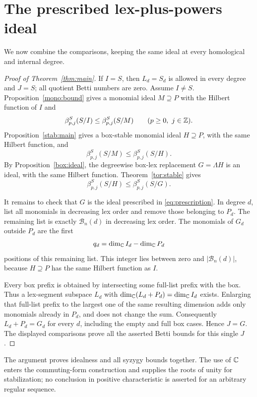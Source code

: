 \section{The prescribed lex-plus-powers ideal}\label{sec:assembly}

We now combine the comparisons, keeping the same ideal at every
homological and internal degree.

\begin{proof}[Proof of Theorem~\ref{thm:main}]
If \(I=S\), then \(L_d=S_d\) is allowed in every degree and \(J=S\);
all quotient Betti numbers are zero. Assume \(I\ne S\).
Proposition~\ref{mono:bound} gives a monomial ideal \(M\supseteq P\)
with the Hilbert function of \(I\) and
\[
 \beta^S_{p,j}(S/I)\le\beta^S_{p,j}(S/M)
 \qquad(p\ge0,\ j\in\mathbb Z).
\]
Proposition~\ref{stab:main} gives a box-stable monomial ideal
\(H\supseteq P\), with the same Hilbert function, and
\[
 \beta^S_{p,j}(S/M)\le\beta^S_{p,j}(S/H).
\]
By Proposition~\ref{box:ideal}, the degreewise box-lex replacement
\(G=\Lambda H\) is an ideal, with the same Hilbert function.
Theorem~\ref{tor:stable} gives
\[
 \beta^S_{p,j}(S/H)\le\beta^S_{p,j}(S/G).
\]

It remains to check that \(G\) is the ideal prescribed in
\eqref{eq:prescription}.
In degree \(d\), list all monomials in decreasing lex order and remove
those belonging to \(P_d\). The remaining list is exactly
\(\mathcal B_n(d)\) in decreasing lex order.
The monomials of \(G_d\) outside \(P_d\) are the first
\[
 q_d=\dim_\mathbb C I_d-\dim_\mathbb C P_d
\]
positions of this remaining list. This integer lies between zero and
\(|\mathcal B_n(d)|\), because \(H\supseteq P\) has the same Hilbert
function as \(I\).

Every box prefix is obtained by intersecting some full-list prefix with
the box. Thus a lex-segment subspace \(L_d\) with
\(\dim_\mathbb C(L_d+P_d)=\dim_\mathbb C I_d\) exists. Enlarging that full-list prefix
to the largest one of the same resulting dimension adds only monomials
already in \(P_d\), and does not change the sum. Consequently
\(L_d+P_d=G_d\) for every \(d\), including the empty and full box cases.
Hence \(J=G\). The displayed comparisons prove all the asserted Betti
bounds for this single \(J\).
\end{proof}

The argument proves idealness and all syzygy bounds together.
The use of \(\mathbb C\) enters the commuting-form construction and supplies the
roots of unity for stabilization; no conclusion in positive
characteristic is asserted for an arbitrary regular sequence.
